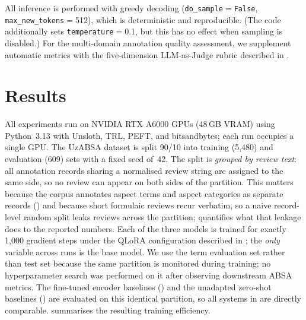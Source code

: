 \documentclass[bdcc,article,submit,moreauthors]{Definitions/mdpi}
\begin{document}
All inference is performed with greedy decoding (\texttt{do\_sample}$=$\texttt{False}, \texttt{max\_new\_tokens}$=$512), which is deterministic and reproducible. (The code additionally sets \texttt{temperature}$=$0.1, but this has no effect when sampling is disabled.) For the multi-domain annotation quality assessment, we supplement automatic metrics with the five-dimension LLM-as-Judge rubric described in .



\section{Results}
\label{sec:results}

All experiments run on NVIDIA RTX A6000 GPUs (48\,GB VRAM) using Python~3.13 with Unsloth, TRL, PEFT, and bitsandbytes; each run occupies a single GPU. The UzABSA dataset is split 90/10 into training (5{,}480) and evaluation (609) sets with a fixed seed of~42. The split is \emph{grouped by review text}: all annotation records sharing a normalised review string are assigned to the same side, so no review can appear on both sides of the partition. This matters because the corpus annotates aspect terms and aspect categories as separate records () and because short formulaic reviews recur verbatim, so a naive record-level random split leaks reviews across the partition;  quantifies what that leakage does to the reported numbers. Each of the three models is trained for exactly 1{,}000 gradient steps under the QLoRA configuration described in ; the \emph{only} variable across runs is the base model. We use the term evaluation set rather than test set because the same partition is monitored during training; no hyperparameter search was performed on it after observing downstream ABSA metrics. The fine-tuned encoder baselines () and the unadapted zero-shot baselines () are evaluated on this identical partition, so all systems in  are directly comparable.  summarises the resulting training efficiency.
\end{document}
